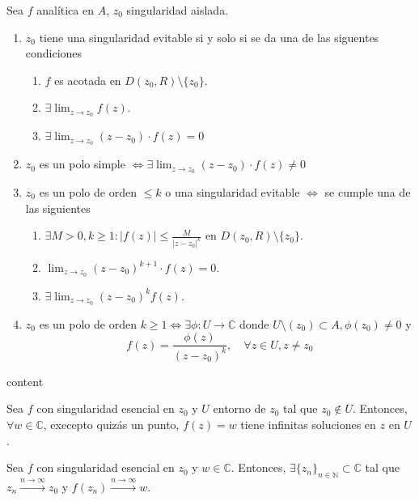\begin{prop}
  Sea $f$ analítica en $A$, $z_{0}$ singularidad aislada.
  \begin{enumerate}[label=(\roman*)]
    \item $z_{0}$ tiene una singularidad evitable si y solo si se da una de las siguentes condiciones
      \begin{enumerate}
        \item $f$ es acotada en $D(z_{0}, R) \setminus \{ z_{0} \}$.
        \item $\exists \lim_{z \to z_{0}} f(z)$.
        \item $\exists \lim_{z \to z_{0}} (z - z_{0}) \cdot f(z) = 0$
      \end{enumerate}
    \item $z_{0}$ es un polo simple $\Leftrightarrow \exists \lim_{z \to z_{0}} (z - z_{0}) \cdot f(z) \neq 0$
    \item $z_{0}$ es un polo de orden $\leq k$ o una singularidad evitable $\Leftrightarrow$ se cumple una de las siguientes
      \begin{enumerate}
        \item $\exists M > 0, k \geq 1 : | f(z) | \leq \frac{M}{| z -z_{0} |^{k}}$ en $D(z_{0}, R) \setminus \{ z_{0} \}$.
        \item $\lim_{z \to z_{0}} (z - z_{0})^{k+1} \cdot f(z) = 0$.
        \item $\exists \lim_{z \to z_{0}} (z -z_{0})^{k} f(z)$.
      \end{enumerate}
    \item $z_{0}$ es un polo de orden $k \geq 1 \Leftrightarrow \exists \phi : U \to \mathbb{C}$ donde $U \setminus (z_{0}) \subset A, \phi(z_{0}) \neq 0$ y
      \[ 
        f(z) = \frac{\phi(z)}{(z -z_{0})^{k}}, \quad \forall z \in U, z \neq z_{0}
      \] 
  \end{enumerate}
\end{prop}

\begin{dem}
  content
\end{dem}

\begin{theo}[de Picard]
  Sea $f$ con singularidad esencial en $z_{0}$ y $U$ entorno de $z_{0}$ tal que $z_{0} \not \in U$. Entonces, $\forall w \in \mathbb{C}$, execepto quizás un punto, $f(z) = w$ tiene infinitas soluciones en $z$ en $U$.
\end{theo}

\begin{theo}
  Sea $f$ con singularidad esencial en $z_{0}$ y $w \in \mathbb{C}$. Entonces, $\exists \{ z_{n} \}_{n \in \mathbb{N}} \subset \mathbb{C}$ tal que $z_{n} \xrightarrow[]{ n \rightarrow \infty } z_{0}$ y $f(z_{n}) \xrightarrow[]{ n \rightarrow \infty } w$.
\end{theo}
